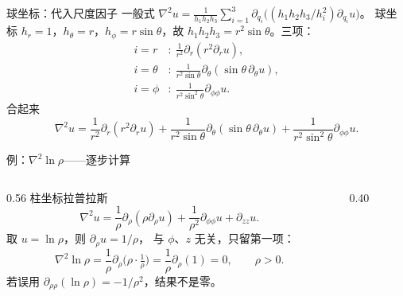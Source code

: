 \documentclass[fontset=windows, chinese, 10pt, xcolor=dvipsnames]{beamer}
\begin{document}
\begin{frame}{球坐标：代入尺度因子}
  \footnotesize
  一般式
  $\nabla^2 u
  =\frac{1}{h_1 h_2 h_3}
    \sum_{i=1}^{3}
    \partial_{q_i}
    \bigl((h_1 h_2 h_3/h_i^2)\partial_{q_i}u\bigr)$。
  球坐标 $h_r=1$，$h_{\theta}=r$，$h_{\phi}=r\sin\theta$，故
  $h_1 h_2 h_3=r^2\sin\theta$。三项：
  \begin{align*}
    i=r &\colon\
      \frac{1}{r^2}\partial_r(r^2\partial_r u),\\
    i=\theta &\colon\
      \frac{1}{r^2\sin\theta}\partial_{\theta}
      (\sin\theta\,\partial_{\theta}u),\\
    i=\phi &\colon\
      \frac{1}{r^2\sin^2\theta}\partial_{\phi\phi}u.
  \end{align*}
  合起来
  \begin{equation*}
    \boxed{\displaystyle
      \nabla^2 u
      =\frac{1}{r^2}\partial_r(r^2\partial_r u)
        +\frac{1}{r^2\sin\theta}\partial_{\theta}(\sin\theta\,\partial_{\theta}u)
        +\frac{1}{r^2\sin^2\theta}\partial_{\phi\phi}u.}
  \end{equation*}
\end{frame}

\begin{frame}{例：$\nabla^2\ln\rho$——逐步计算}
  \begin{columns}[T]
    \begin{column}{0.56\textwidth}
      {\small
      柱坐标拉普拉斯
      \begin{equation*}
        \nabla^2 u
        =\frac{1}{\rho}\partial_{\rho}(\rho\partial_{\rho}u)
          +\frac{1}{\rho^2}\partial_{\phi\phi}u
          +\partial_{zz}u.
      \end{equation*}
      取 $u=\ln\rho$，则 $\partial_{\rho}u=1/\rho$，
      与 $\phi$、$z$ 无关，只留第一项：
      \begin{equation*}
        \nabla^2\ln\rho
        =\frac{1}{\rho}\partial_{\rho}
          \bigl(\rho\cdot\tfrac{1}{\rho}\bigr)
        =\frac{1}{\rho}\partial_{\rho}(1)=0,
        \qquad\rho>0.
      \end{equation*}
      若误用 $\partial_{\rho\rho}(\ln\rho)=-1/\rho^2$，结果不是零。}
    \end{column}
    \begin{column}{0.40\textwidth}
      \centering
      \vspace{1.2em}
      \scalebox{0.78}{}
    \end{column}
  \end{columns}
\end{frame}
\end{document}
